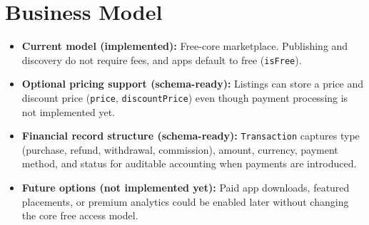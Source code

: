 \documentclass[12pt,a4paper]{article}
\begin{document}
\section{Business Model}
\begin{itemize}
    \item \textbf{Current model (implemented):} Free-core marketplace. Publishing and discovery do not require fees, and apps default to free (\texttt{isFree}).
    \item \textbf{Optional pricing support (schema-ready):} Listings can store a price and discount price (\texttt{price}, \texttt{discountPrice}) even though payment processing is not implemented yet.
    \item \textbf{Financial record structure (schema-ready):} \texttt{Transaction} captures type (purchase, refund, withdrawal, commission), amount, currency, payment method, and status for auditable accounting when payments are introduced.
    \item \textbf{Future options (not implemented yet):} Paid app downloads, featured placements, or premium analytics could be enabled later without changing the core free access model.
\end{itemize}
\end{document}
